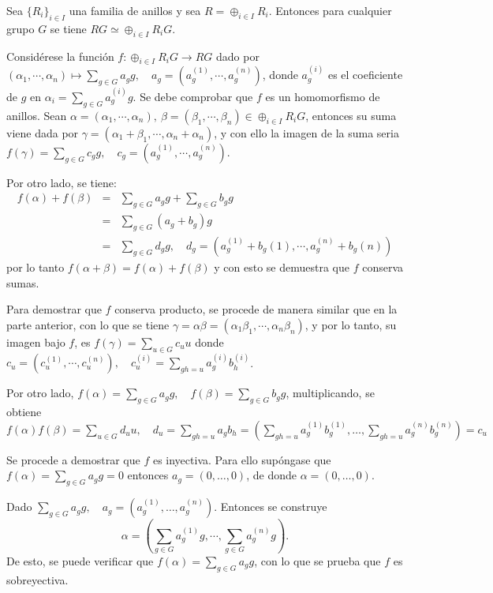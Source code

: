 \begin{lema}\label{lema2}
Sea $\{R_i\}_{i\in I}$ una familia de anillos y sea $R = \oplus_{i \in I}R_i$. Entonces para cualquier grupo $G$ se tiene $RG \simeq \oplus_{i \in I}R_iG$.
\end{lema}
\begin{proof*}
Considérese la función $f \colon \oplus_{i \in I}R_iG \to RG$ dado por $(\alpha_1, \cdots, \alpha_n) \mapsto \sum_{g \in G}a_gg, \quad a_g = (a_g^{(1)}, \cdots, a_g ^{(n)})$, donde $a_g^{(i)}$ es el coeficiente de $g$ en $\alpha_i = \sum_{g \in G}a_g^{(i)}g$. Se debe comprobar que $f$ es un homomorfismo de anillos.
Sean $\alpha = (\alpha_1, \cdots, \alpha_n), \  \beta = (\beta_1, \cdots, \beta_n) \in \oplus_{i \in I}R_iG$, entonces su suma viene dada por $\gamma = (\alpha_1 + \beta_1, \cdots, \alpha_n + \alpha_n)$, y con ello la imagen de la suma seria $f(\gamma) = \sum_{g \in G}c_gg, \quad c_g = (a_g^{(1)}, \cdots, a_g^{(n)})$. 

Por otro lado, se tiene:
\begin{eqnarray*}
f(\alpha) + f(\beta) &=& \sum_{g \in G}a_gg + \sum_{g\in G}b_gg\\
 &=& \sum_{g \in G}(a_g + b_g)g \\
  & = &  \sum_{g \in G}d_gg, \quad d_g = (a_g^{(1)} + b_g{(1)}, \cdots, a_g^{(n)} + b_g{(n)} )
\end{eqnarray*}
por lo tanto $f(\alpha + \beta) = f(\alpha) + f(\beta)$ y con esto se demuestra que $f$ conserva sumas.

Para demostrar que $f$ conserva producto, se procede de manera similar que en la parte anterior, con lo que se  tiene $\gamma = \alpha\beta = (\alpha_1\beta_1, \cdots, \alpha_n\beta_n)$, y por lo tanto, su imagen bajo $f$, es $f(\gamma) = \sum_{u \in G}c_uu$ donde $c_u = (c_u^{(1)}, \cdots, c_u^{(n)}), \quad c_u^{(i)} = \sum_{gh=u}a_g^{(i)}b_h^{(i)}$.

Por otro lado, $f(\alpha) = \sum_{g \in G}a_gg, \quad f(\beta) = \sum_{g \in G}b_gg$, multiplicando, se obtiene $f(\alpha)f(\beta) = \sum_{u \in G}d_uu, \quad d_u = \sum_{gh = u }a_gb_h = \left( \sum_{gh=u}a_g^{(1)}b_g^{(1)}, \dots, \sum_{gh=u}a_g^{(n)}b_g^{(n) } \right) = c_u$

Se procede a demostrar que $f$ es inyectiva. Para ello supóngase que $f(\alpha) = \sum_{g\in G}a_gg = 0$ entonces $a_g = (0, \dots, 0)$, de donde $\alpha = (0, \dots, 0)$. 

Dado $\sum_{g \in G}a_gg, \quad a_g = (a_g^{(1)}, \dots, a_g^{(n)})$. Entonces se construye \[\alpha= \left( \sum_{g\in G}a_g^{(1)}g, \cdots, \sum_{g\in G}a_g^{(n)}g  \right).\] De esto, se puede verificar que $f(\alpha) = \sum_{g \in G}a_gg$, con lo que se prueba que $f$ es sobreyectiva. \qedhere
\end{proof*}
